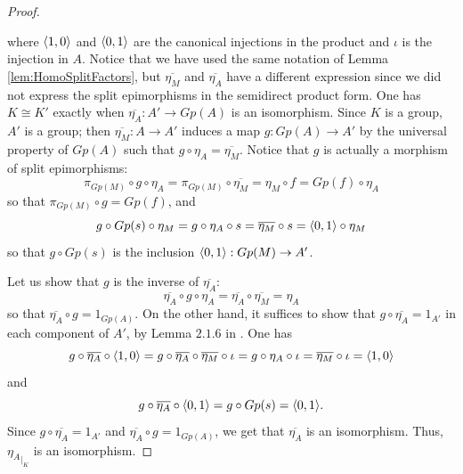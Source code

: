 \begin{theorem}
\begin{proof}
        \begin{center}
        \end{center}
        where $\langle{1},{0}\rangle$ and $\langle{0},{1}\rangle$ are the canonical injections in the product and $\iota$ is the injection in $A$. Notice that we have used the same notation of Lemma \ref{lem:HomoSplitFactors}, but $\overline{\eta_M}$ and $\overline{\eta_A}$ have a different expression since we did not express the split epimorphisms in the semidirect product form. One has $K\cong K'$ exactly when $\overline{\eta_A}:A'\to Gp(A)$ is an isomorphism. Since $K$ is a group, $A'$ is a group; then $\overline{\eta_M}:A\to A'$ induces a map $g:Gp(A)\to A'$ by the universal property of $Gp(A)$ such that $g\circ\eta_A = \overline{\eta_M}$. Notice that $g$ is actually a morphism of split epimorphisms:
        \[ \pi_{Gp(M)}\circ g\circ \eta_A = \pi_{Gp(M)}\circ \overline{\eta_{M}} = \eta_M\circ f = Gp(f) \circ \eta_A \]
        so that $\pi_{Gp(M)}\circ g = Gp(f)$, and 
        \[ g\circ Gp(s)\circ \eta_M = g\circ \eta_A\circ s = \overline{\eta_M}\circ s = \langle{0},{1}\rangle\circ \eta_M \]
        so that $g\circ Gp(s)$ is the inclusion $\langle{0},{1}\rangle:Gp(M)\to A'$.

        Let us show that $g$ is the inverse of $\overline{\eta_A}$:
        \[ \overline{\eta_A}\circ g \circ \eta_A = \overline{\eta_A} \circ \overline{\eta_M} = \eta_A \]
        so that $\overline{\eta_A}\circ g = 1_{Gp(A)}$. On the other hand, it suffices to show that $g\circ\overline{\eta_A} = 1_{A'}$ in each component of $A'$, by Lemma $2.1.6$ in \cite{martins2013semidirect}. One has
        \[ g\circ\overline{\eta_A}\circ \langle{1},{0}\rangle = g\circ\overline{\eta_A}\circ\overline{\eta_M}\circ \iota = g\circ \eta_A\circ \iota = \overline{\eta_M}\circ \iota = \langle{1},{0}\rangle \]
        and
        \[ g\circ \overline{\eta_A}\circ \langle{0},{1}\rangle = g\circ Gp(s) = \langle{0},{1}\rangle. \]
        Since $g\circ \overline{\eta_A} = 1_{A'}$ and $\overline{\eta_A}\circ g = 1_{Gp(A)}$, we get that $\overline{\eta_A}$ is an isomorphism. Thus, ${\eta_A}_{|_K}$ is an isomorphism.
    \end{proof}
\end{theorem}
